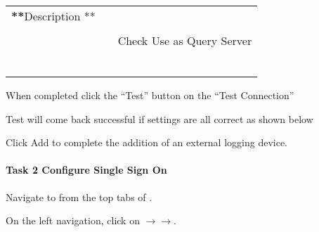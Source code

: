 \documentclass[letterpaper,10pt,english]{sphinxmanual}
\begin{document}
\begin{savenotes}\sphinxattablestart
\centering
\begin{tabulary}{\linewidth}[t]{|T|T|T|}
\hline

&
&\\
\hline
{\color{red}\bfseries{}**}Description **
&
&\\
\hline
{}
&
&\\
\hline
{}
&
&
Check Use as Query Server
\\
\hline
{}
&
&\\
\hline
{}
&
&\\
\hline
{}
&&\\
\hline
{}
&
&\\
\hline
{}
&
&\\
\hline
{}
&
&\\
\hline
\end{tabulary}
\par
\sphinxattableend\end{savenotes}

When completed click the “Test” button on the “Test Connection”

Test will come back successful if settings are all correct as shown
below


Click Add to complete the addition of an external logging device.


\paragraph{Task 2 \textendash{} Configure Single Sign On}
\label{\detokenize{class1/module6/lab1:task-2-configure-single-sign-on}}
Navigate to  from the top tabs of .

On the left navigation, click on \(\rightarrow\)\(\rightarrow\).
\end{document}
